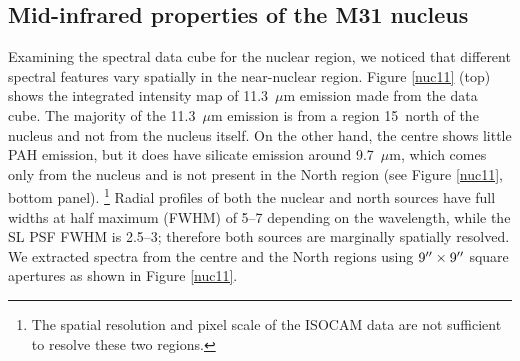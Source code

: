 \subsection{Mid-infrared properties of the M31 nucleus}
\label{sect:nucleus}


Examining the spectral data cube for the nuclear region, we noticed that different spectral features
vary spatially in the near-nuclear region.
Figure \ref{nuc11} (top) shows the integrated intensity map of 11.3~$\mu$m emission made from the data cube. 
The majority of the 11.3~$\mu$m  emission is from a region 15\arcsec\ north of the nucleus and not from the nucleus itself. 
On the other hand, the centre shows little PAH emission,  but it does have silicate emission around 9.7~$\mu$m, 
which comes only from the nucleus and is not present in the North region  (see Figure \ref{nuc11}, bottom panel).%
\footnote{The spatial resolution and pixel scale of the ISOCAM data are not sufficient to resolve these two regions.}
Radial profiles of both the nuclear and north sources have full widths at half maximum (FWHM) of 5--7\arcsec
depending on the wavelength, while the SL PSF FWHM is 2.5--3\arcsec; therefore both sources are
marginally spatially resolved.  %
We extracted spectra from the centre and the North regions using  $9\hbox{$^{\prime\prime}$} \times 9\hbox{$^{\prime\prime}$}$ 
square apertures as shown in Figure \ref{nuc11}. 

